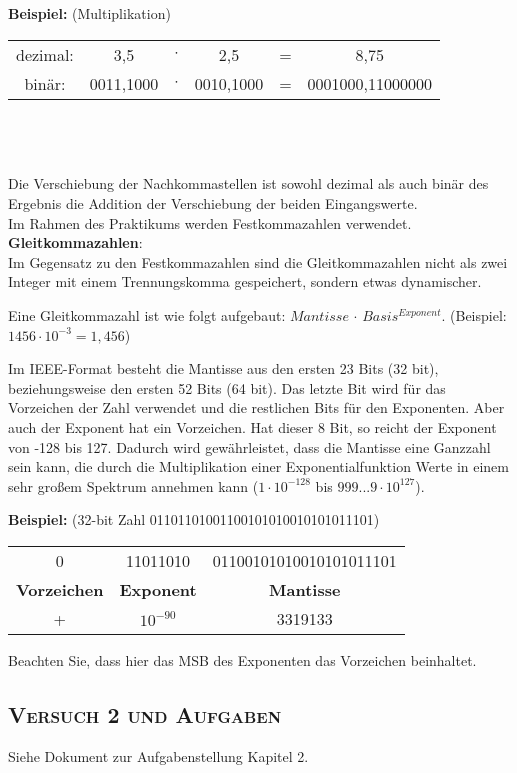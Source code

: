 \textbf{Beispiel:} (Multiplikation) \\
\begin{tabular}{cccccc}
	dezimal: & 3,5 & $\cdot$ & 2,5 & = & 8,75 \\
	binär: & 0011,1000 & $\cdot$ & 0010,1000 & = & 0001000,11000000 \\
\end{tabular}\\
\\ \\
Die Verschiebung der Nachkommastellen ist sowohl dezimal als auch binär des Ergebnis die Addition der Verschiebung der beiden Eingangswerte. \\
Im Rahmen des Praktikums werden Festkommazahlen verwendet.
\\

\textbf{Gleitkommazahlen}:\\
Im Gegensatz zu den Festkommazahlen sind die Gleitkommazahlen nicht als zwei Integer mit einem Trennungskomma gespeichert, sondern etwas dynamischer.

Eine Gleitkommazahl ist wie folgt aufgebaut: $Mantisse$ $\cdot$ $Basis^{Exponent}$. (Beispiel: $1456 \cdot 10^{-3} = 1,456$)

Im IEEE-Format besteht die Mantisse aus den ersten 23 Bits (32 bit), beziehungsweise den ersten 52 Bits (64 bit). Das letzte Bit wird für das Vorzeichen der Zahl verwendet und die restlichen Bits für den Exponenten. Aber auch der Exponent hat ein Vorzeichen. Hat dieser 8 Bit, so reicht der Exponent von -128 bis 127. Dadurch wird gewährleistet, dass die Mantisse eine Ganzzahl sein kann, die durch die Multiplikation einer Exponentialfunktion Werte in einem sehr großem Spektrum annehmen kann ($1 \cdot 10^{-128}$ bis $999...9 \cdot 10^{127}$).

\textbf{Beispiel:} (32-bit Zahl 01101101001100101010010101011101)\\
\begin{tabular}{ccc}
0 & 11011010 & 01100101010010101011101\\
\textbf{Vorzeichen} & \textbf{Exponent} & \textbf{Mantisse}
\\
+ & $10^{-90}$ & 3319133
\end{tabular}

Beachten Sie, dass hier das MSB des Exponenten das Vorzeichen beinhaltet.\cite{floating_point}
\subsection{\textsc{Versuch 2 und Aufgaben}}
Siehe Dokument zur Aufgabenstellung Kapitel 2.
\newpage

